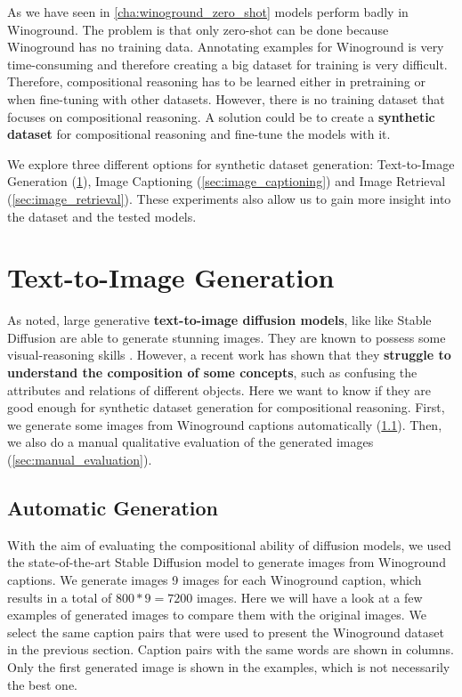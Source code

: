 As we have seen in \cref{cha:winoground_zero_shot} models perform badly in Winoground. The problem is that only zero-shot can be done because Winoground has no training data. Annotating examples for Winoground is very time-consuming and therefore creating a big dataset for training is very difficult. Therefore, compositional reasoning has to be learned either in pretraining or when fine-tuning with other datasets. However, there is no training dataset that focuses on compositional reasoning. A solution could be to create a \textbf{synthetic dataset} for compositional reasoning and fine-tune the models with it.

We explore three different options for synthetic dataset generation: Text-to-Image Generation (\ref{sec:text_to_image_generation}), Image Captioning (\ref{sec:image_captioning}) and Image Retrieval (\ref{sec:image_retrieval}). These experiments also allow us to gain more insight into the dataset and the tested models.

\section{Text-to-Image Generation} \label{sec:text_to_image_generation}

As noted, large generative \textbf{text-to-image diffusion models}, like like Stable Diffusion \cite{rombach2021highresolution} are able to generate stunning images. They are known to possess some visual-reasoning skills \cite{cho2022dall}. However, a recent work \cite{liu2022compositional} has shown that they \textbf{struggle to understand the composition of some concepts}, such as confusing the attributes and relations of different objects. Here we want to know if they are good enough for synthetic dataset generation for compositional reasoning. First, we generate some images from Winoground captions automatically (\cref{sec:automatic_generation}). Then, we also do a manual qualitative evaluation of the generated images (\cref{sec:manual_evaluation}).

\subsection{Automatic Generation} \label{sec:automatic_generation}

With the aim of evaluating the compositional ability of diffusion models, we used the state-of-the-art Stable Diffusion model \cite{rombach2021highresolution} to generate images from Winoground captions. We generate images 9 images for each Winoground caption, which results in a total of $800*9=7200$ images. Here we will have a look at a few examples of generated images to compare them with the original images. We select the same caption pairs that were used to present the Winoground dataset in the previous section. Caption pairs with the same words are shown in columns. Only the first generated image is shown in the examples, which is not necessarily the best one.

